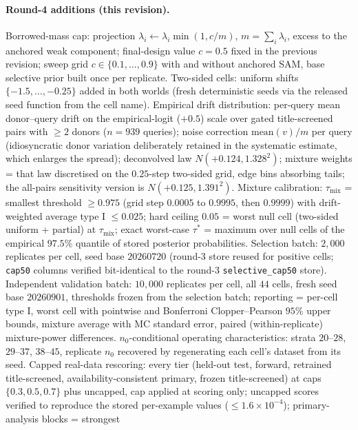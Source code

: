 \documentclass[11pt]{article}
\begin{document}
\paragraph{Round-4 additions (this revision).} Borrowed-mass cap: projection
$\lambda_i \leftarrow \lambda_i \min(1, c/m)$, $m=\sum_i\lambda_i$, excess to
the anchored weak component; final-design value $c=0.5$ fixed in the
previous revision; sweep grid $c \in \{0.1,\dots,0.9\}$ with and without
anchored SAM, base selective prior built once per replicate. Two-sided
cells: uniform shifts $\{-1.5,\dots,-0.25\}$ added in both worlds (fresh
deterministic seeds via the released seed function from the cell name).
Empirical drift distribution: per-query mean donor--query drift on the
empirical-logit ($+0.5$) scale over gated title-screened pairs with $\ge 2$
donors ($n=939$ queries); noise correction $\mathrm{mean}(v)/m$ per query
(idiosyncratic donor variation deliberately retained in the systematic
estimate, which enlarges the spread); deconvolved law
$N(+0.124, 1.328^2)$; mixture weights = that law discretised on the
$0.25$-step two-sided grid, edge bins absorbing tails; the all-pairs
sensitivity version is $N(+0.125, 1.391^2)$. Mixture calibration:
$\tau_{\mathrm{mix}}$ = smallest threshold $\ge 0.975$ (grid step $0.0005$
to $0.9995$, then $0.9999$) with drift-weighted average type I $\le 0.025$;
hard ceiling $0.05$ = worst null cell (two-sided uniform + partial) at
$\tau_{\mathrm{mix}}$; exact worst-case $\tau^{*}$ = maximum over null
cells of the empirical $97.5\%$ quantile of stored posterior probabilities.
Selection batch: $2{,}000$ replicates per cell, seed base $20260720$
(round-3 store reused for positive cells; \texttt{cap50} columns verified
bit-identical to the round-3 \texttt{selective\_cap50} store). Independent
validation batch: $10{,}000$ replicates per cell, all $44$ cells, fresh
seed base $20260901$, thresholds frozen from the selection batch; reporting
= per-cell type I, worst cell with pointwise and Bonferroni
Clopper--Pearson $95\%$ upper bounds, mixture average with MC standard
error, paired (within-replicate) mixture-power differences.
$n_0$-conditional operating characteristics: strata $20$--$28$, $29$--$37$,
$38$--$45$, replicate $n_0$ recovered by regenerating each cell's dataset
from its seed. Capped real-data rescoring: every tier (held-out test,
forward, retrained title-screened, availability-consistent primary, frozen
title-screened) at caps $\{0.3, 0.5, 0.7\}$ plus uncapped, cap applied at
scoring only; uncapped scores verified to reproduce the stored per-example
values ($\le 1.6\times10^{-4}$); primary-analysis blocks = strongest
\end{document}
